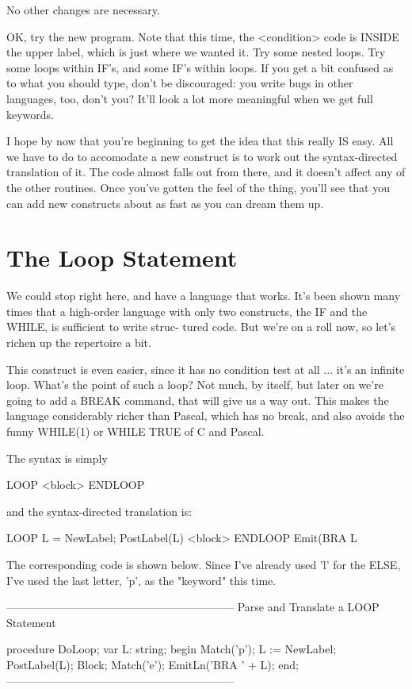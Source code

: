 \documentclass[float=false, crop=false]{standalone}
\begin{document}
No other changes are necessary.

OK, try the new program. Note that this time, the <condition> code is INSIDE the
upper label, which is just where we wanted it. Try some nested loops. Try some
loops within IF's, and some IF's within loops. If you get a bit confused as to
what you should type, don't be discouraged: you write bugs in other languages,
too, don't you? It'll look a lot more meaningful when we get full keywords.

I hope by now that you're beginning to get the idea that this really IS easy.
All we have to do to accomodate a new construct is to work out the
syntax-directed translation of it. The code almost falls out from there, and it
doesn't affect any of the other routines. Once you've gotten the feel of the
thing, you'll see that you can add new constructs about as fast as you can dream
them up.


\section{The Loop Statement}

We could stop right here, and have a language that works. It's been shown many
times that a high-order language with only two constructs, the IF and the WHILE,
is sufficient to write struc- tured code. But we're on a roll now, so let's
richen up the repertoire a bit.

This construct is even easier, since it has no condition test at all ... it's an
infinite loop. What's the point of such a loop? Not much, by itself, but later
on we're going to add a BREAK command, that will give us a way out. This makes
the language considerably richer than Pascal, which has no break, and also
avoids the funny WHILE(1) or WHILE TRUE of C and Pascal.

The syntax is simply

     LOOP <block> ENDLOOP

and the syntax-directed translation is:


     LOOP           { L = NewLabel;
                      PostLabel(L) }
     <block>
     ENDLOOP        { Emit(BRA L }


The corresponding code is shown below. Since I've already used 'l' for the ELSE,
I've used the last letter, 'p', as the "keyword" this time.

\begin{code}
{--------------------------------------------------------------}
{ Parse and Translate a LOOP Statement }

procedure DoLoop;
var L: string;
begin
   Match('p');
   L := NewLabel;
   PostLabel(L);
   Block;
   Match('e');
   EmitLn('BRA ' + L);
end;
{--------------------------------------------------------------}
\end{code}
\end{document}
